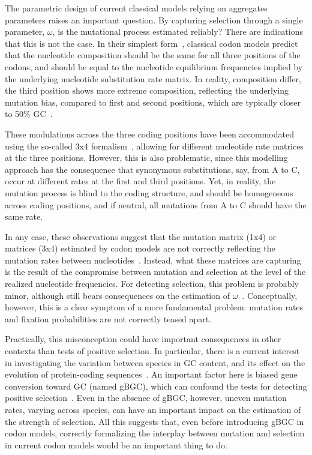 The parametric design of current classical models relying on aggregates parameters raises an important question.
By capturing selection through a single parameter, $\omega$, is the mutational process estimated reliably?
There are indications that this is not the case.
In their simplest form~\citep{Muse1994}, classical codon models predict that the nucleotide composition should be the same for all three positions of the codons, and should be equal to the nucleotide equilibrium frequencies implied by the underlying nucleotide substitution rate matrix.
In reality, composition differ, the third position shows more extreme composition, reflecting the underlying mutation bias, compared to first and second positions, which are typically closer to 50\% GC~\citep{Singer2000}.

These modulations across the three coding positions have been accommodated using the so-called 3x4 formalism~\citep{Goldman1994, Pond2005a}, allowing for different nucleotide rate matrices at the three positions.
However, this is also problematic, since this modelling approach has the consequence that synonymous substitutions, say, from A to C, occur at different rates at the first and third positions.
Yet, in reality, the mutation process is blind to the coding structure, and should be homogeneous across coding positions, and if neutral, all mutations from A to C should have the same rate.

In any case, these observations suggest that the mutation matrix (1x4) or matrices (3x4) estimated by codon models are not correctly reflecting the mutation rates between nucleotides~\citep{Rodrigue2008a}.
Instead, what these matrices are capturing is the result of the compromise between mutation and selection at the level of the realized nucleotide frequencies.
For detecting selection, this problem is probably minor, although still bears consequences on the estimation of $\omega$~\citep{Spielman2015}.
Conceptually, however, this is a clear symptom of a more fundamental problem: mutation rates and fixation probabilities are not correctly teased apart.

Practically, this misconception could have important consequences in other contexts than tests of positive selection.
In particular, there is a current interest in investigating the variation between species in GC content, and its effect on the evolution of protein-coding sequences~\citep{Bolivar2019}.
An important factor here is biased gene conversion toward GC (named gBGC), which can confound the tests for detecting positive selection~\citep{Galtier2009,Ratnakumar2010, Figuet2014}.
Even in the absence of \acrshort{gBGC}, however, uneven mutation rates, varying across species, can have an important impact on the estimation of the strength of selection.
All this suggests that, even before introducing \acrshort{gBGC} in codon models, correctly formalizing the interplay between mutation and selection in current codon models would be an important thing to do.

